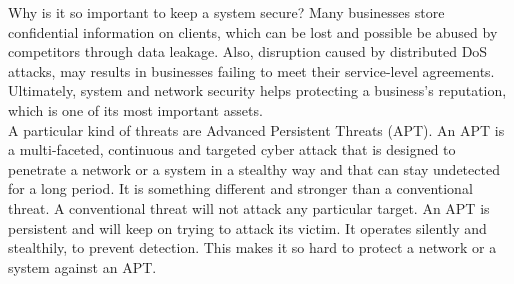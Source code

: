 Why is it so important to keep a system secure?  Many businesses store confidential information on clients, which can be lost and possible be abused by competitors through data leakage. Also, disruption caused by distributed DoS attacks, may results in businesses failing to meet their service-level agreements. Ultimately, system and network security helps protecting a business's reputation, which is one of its most important assets. \\

A particular kind of threats are Advanced Persistent Threats (APT). An APT is a multi-faceted, continuous and targeted cyber attack that is designed to penetrate a network or a system in a stealthy way and that can stay undetected for a long period. It is something different and stronger than a conventional threat. A conventional threat will not attack any particular target. An APT is persistent and will keep on trying to attack its victim. It operates silently and stealthily, to prevent detection. This makes it so hard to protect a network or a system against an APT. 



